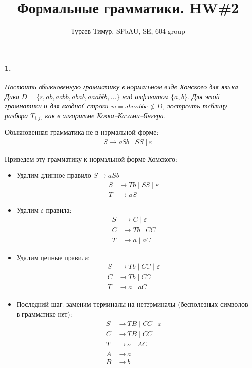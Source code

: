 \documentclass[russian,table]{article}
\begin{document}
\title{Формальные грамматики. HW\#2}
\author{Тураев Тимур, SPbAU, SE, 604 group}
\maketitle

\paragraph*{1.}

\textit{Постоить обыкновенную грамматику в нормальном виде Хомского для языка Дика $D=\{\varepsilon, ab, aabb, abab, aaabbb, \ldots\}$ над алфавитом $\{a,b\}$. Для этой грамматики и для входной строки $w=abaabba \notin D$, построить таблицу разбора $T_{i,j}$, как в алгоритме Кокка–Касами–Янгера.}

Обыкновенная грамматика не в нормальной форме:
\begin{align*}
S \to aSb \mid SS \mid \varepsilon
\end{align*}

Приведем эту грамматику к нормальной форме Хомского:

\begin{itemize}
\item Удалим длинное правило $S \to aSb$
\begin{align*}
S & \to Tb \mid SS \mid \varepsilon \\
T & \to aS
\end{align*}

\item Удалим $\varepsilon$-правила:
\begin{align*}
S & \to C \mid \varepsilon \\
C & \to Tb \mid CC \\
T & \to a \mid aC
\end{align*}

\item Удалим цепные правила:
\begin{align*}
S & \to Tb \mid CC \mid \varepsilon \\
C & \to Tb \mid CC \\
T & \to a \mid aC
\end{align*}

\item Последний шаг: заменим терминалы на нетерминалы (бесполезных символов в грамматике нет):
\begin{align*}
S & \to TB \mid CC \mid \varepsilon \\
C & \to TB \mid CC \\
T & \to a \mid AC \\
A & \to a \\
B & \to b
\end{align*}
\end{itemize}
\end{document}
